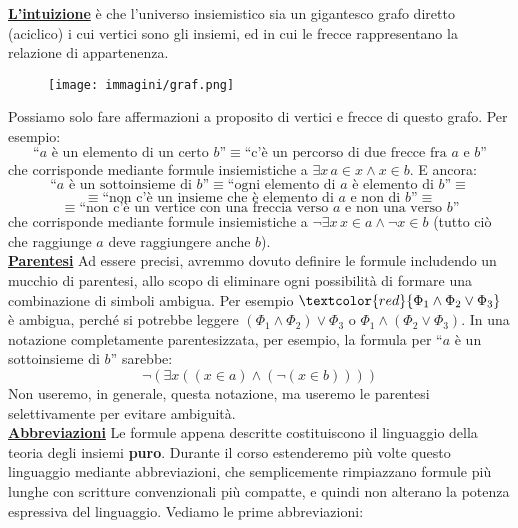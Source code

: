 \documentclass[11pt]{scrartcl}
\begin{document}
\textbf{\underline{L'intuizione}} è che l'universo insiemistico sia un gigantesco grafo diretto (aciclico) i cui vertici sono gli insiemi,
ed in cui le frecce rappresentano la relazione di appartenenza.

\begin{center}
	\begin{figure}[h]
		\centering
		\texttt{[image: immagini/graf.png]}
	\end{figure}
\end{center}

Possiamo solo fare affermazioni a proposito di vertici e frecce di questo grafo. Per esempio:
\[ \text{``$a$ è un elemento di un certo $b$''} \equiv \text{``c'è un percorso di due frecce fra $a$ e $b$''} 
	\]
che corrisponde mediante formule insiemistiche a $ \exists x \, a \in x \land x \in b$. E ancora:
\[\text{``$a$ è un sottoinsieme di $b$''} \equiv \text{``ogni elemento di $a$ è elemento di $b$''} \equiv \]\[
		\equiv\text{``non c'è un insieme che è elemento di $a$ e non di $b$''}\equiv\]\[
	 \equiv \text{``non c'è un vertice con una freccia verso $a$ e non una verso $b$''}
	\]
che corrisponde mediante formule insiemistiche a $\neg\exists x \, x \in a \land \neg x \in b$ (tutto ciò che raggiunge $a$ deve raggiungere anche $b$).\\
\textbf{\underline{Parentesi}} Ad essere precisi, avremmo dovuto definire le formule includendo un mucchio di parentesi, allo scopo di eliminare ogni possibilità
di formare una combinazione di simboli ambigua. Per esempio $\textcolor{red}{\Phi_1 \land \Phi_2 \lor \Phi_3}$ è ambigua, perché si potrebbe leggere $(\Phi_1 \land \Phi_2) \lor \Phi_3$
o $\Phi_1 \land (\Phi_2 \lor \Phi_3)$. In una notazione completamente parentesizzata, per esempio, la formula per ``$a$ è un sottoinsieme di $b$'' sarebbe:
\[ \neg(\exists x((x \in a)\land(\neg(x \in b))))
	\]
Non useremo, in generale, questa notazione, ma useremo le parentesi selettivamente per evitare ambiguità.\\
\textbf{\underline{Abbreviazioni}} Le formule appena descritte costituiscono il linguaggio della teoria degli insiemi \textbf{puro}. Durante il corso estenderemo
più volte questo linguaggio mediante abbreviazioni, che semplicemente rimpiazzano formule più lunghe con scritture convenzionali più compatte, e quindi non alterano 
la potenza espressiva del linguaggio. Vediamo le prime abbreviazioni:
\end{document}
